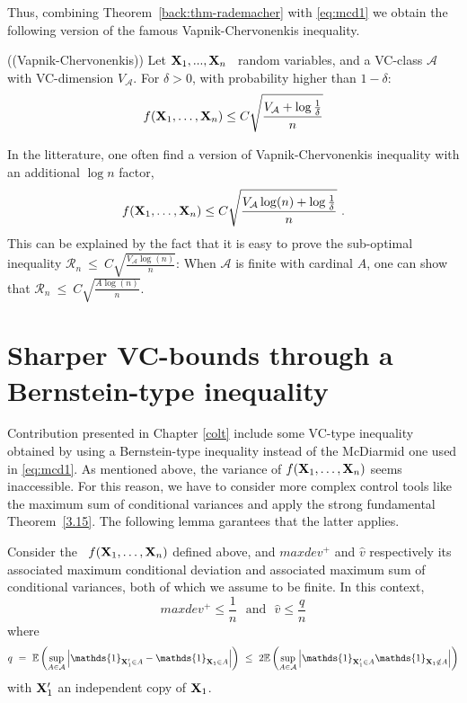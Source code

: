 Thus, combining Theorem~\ref{back:thm-rademacher} with \eqref{eq:mcd1} we obtain the following version of the famous Vapnik-Chervonenkis inequality.
\begin{theorem}({\sc (Vapnik-Chervonenkis)})
Let $\mathbf X_1,...,\mathbf X_n$ \iid~random variables, and a VC-class $\mathcal{A}$ with VC-dimension $V_{\mathcal{A}}$. For $\delta>0$, with probability higher than $1-\delta$:
\begin{align*}
f(\mb X_1,\ldots,\mb X_n) \le C \sqrt{\frac{V_{\mathcal{A}} + \log{\frac{1}{\delta}}}{n}} %
\end{align*}
\end{theorem}
In the litterature, one often find a version of Vapnik-Chervonenkis inequality with an additional $\log n$ factor,
\begin{align*}
f(\mb X_1,\ldots,\mb X_n) \le C \sqrt{\frac{V_{\mathcal{A}}\log(n) + \log{\frac{1}{\delta}}}{n}}~. %
\end{align*}
This can be explained by the fact that it is easy to prove the sub-optimal inequality $\mathcal{R}_n ~\le~ C \sqrt{\frac{V_{\mathcal{A}}\log(n)}{n}}$: When $\mathcal{A}$ is finite with cardinal $A$, one can show that $\mathcal{R}_n ~\le~ C \sqrt{\frac{A\log(n)}{n}}$.

\section{Sharper VC-bounds through a Bernstein-type inequality}

Contribution presented in Chapter \ref{colt} include some VC-type inequality obtained by using a Bernstein-type inequality instead of the McDiarmid one used in \eqref{eq:mcd1}. As mentioned above, the variance of $f(\mathbf X_1,\ldots,\mathbf X_n)$ seems inaccessible. For this reason, we have to consider more complex control tools like the maximum sum of conditional variances and apply the strong fundamental Theorem~\ref{3.15}. The following lemma garantees that the latter applies.
\begin{lemma}
\label{back:lem-1}
Consider the \rv~$f(\mathbf X_1,\ldots,\mathbf X_n)$ defined above, and $maxdev^+$ and $\hat v$ respectively its associated maximum conditional deviation and associated maximum sum of conditional variances, both of which we assume to be finite. In this context,
$$maxdev^+ \le \frac{1}{n} \text{~~and~~} \hat v \le \frac{q}{n}$$ where 
\begin{align*}
q ~=~ \mathbb{E}\left ( \sup_{A \in \mathcal{A}} \left | \mathds{1}_{\mb X_1' \in A} - \mathds{1}_{\mb X_1 \in A} \right|\right) ~\le~ 2 \mathbb{E}\left ( \sup_{A \in \mathcal{A}} \left | \mathds{1}_{\mb X_1' \in A}  \mathds{1}_{\mb X_1 \notin A} \right|\right) 
\end{align*}
with $\mathbf X'_1$ an independent copy of $\mathbf X_1$.
\end{lemma}

